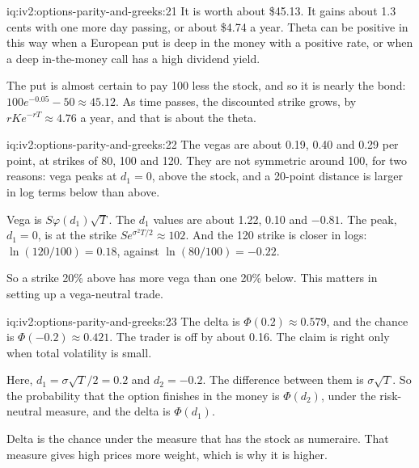 \begin{solution}{iq:iv2:options-parity-and-greeks:21}
It is worth about \$45.13. It gains about 1.3 cents with one more day passing, or about \$4.74 a year. Theta can be positive in this way when a European put is deep in the money with a positive rate, or when a deep in-the-money call has a high dividend yield.

The put is almost certain to pay 100 less the stock, and so it is nearly the bond: $100e^{-0.05} - 50 \approx 45.12$. As time passes, the discounted strike grows, by $rKe^{-rT} \approx 4.76$ a year, and that is about the theta.

\end{solution}

\begin{solution}{iq:iv2:options-parity-and-greeks:22}
The vegas are about 0.19, 0.40 and 0.29 per point, at strikes of 80, 100 and 120. They are not symmetric around 100, for two reasons: vega peaks at $d_1 = 0$, above the stock, and a 20-point distance is larger in log terms below than above.

Vega is $S\varphi(d_1)\sqrt T$. The $d_1$ values are about 1.22, 0.10 and $-0.81$. The peak, $d_1 = 0$, is at the strike $Se^{\sigma^2T/2} \approx 102$. And the 120 strike is closer in logs: $\ln(120/100) = 0.18$, against $\ln(80/100) = -0.22$.

So a strike 20\% above has more vega than one 20\% below. This matters in setting up a vega-neutral trade.

\end{solution}

\begin{solution}{iq:iv2:options-parity-and-greeks:23}
The delta is $\Phi(0.2) \approx 0.579$, and the chance is $\Phi(-0.2) \approx 0.421$. The trader is off by about 0.16. The claim is right only when total volatility is small.

Here, $d_1 = \sigma\sqrt T/2 = 0.2$ and $d_2 = -0.2$. The difference between them is $\sigma\sqrt T$. So the probability that the option finishes in the money is $\Phi(d_2)$, under the risk-neutral measure, and the delta is $\Phi(d_1)$.

Delta is the chance under the measure that has the stock as numeraire. That measure gives high prices more weight, which is why it is higher.

\end{solution}

